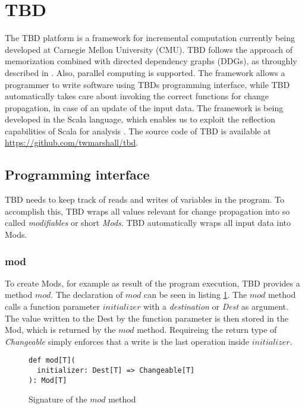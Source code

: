 \section{TBD}
\label{sec:tbd}
The TBD platform is a framework for incremental computation currently being developed at Carnegie Mellon University (CMU). TBD follows the approach of memorization combined with directed dependency graphs (DDGs), as throughly described in \cite{Acar2005thesis}. Also, parallel computing is supported. The framework allows a programmer to write software using TBDs programming interface, while TBD automatically takes care about invoking the correct functions for change propagation, in case of an update of the input data. \cite{?}
The framework is being developed in the Scala language, which enables us to exploit the reflection capabilities of Scala for analysis \cite{burmako2013scala} \cite{stocker2010scala}. 
The source code of TBD is available at \hyperref[]{https://github.com/twmarshall/tbd}. 

\subsection{Programming interface}
TBD needs to keep track of reads and writes of variables in the program. To accomplish this, TBD wraps all values relevant for change propagation into so called \textit{modifiables} or short \textit{Mods}. TBD automatically wraps all input data into Mods. 

\subsubsection{mod}
To create Mods, for example as result of the program execution, TBD provides a method $mod$. The declaration of $mod$ can be seen in listing \ref{code:mod}. The $mod$ method calls a function parameter $initializer$ with a \textit{destination} or \textit{Dest} as argument. The value written to the Dest by the function parameter is then stored in the Mod, which is returned by the $mod$ method. Requireing the return type of \textit{Changeable} simply enforces that a write is the last operation inside $initializer$. 

\begin{figure}
\begin{lstlisting}[frame=single,basicstyle=\ttfamily]
def mod[T](
  initializer: Dest[T] => Changeable[T]
): Mod[T]
\end{lstlisting}
\caption{Signature of the $mod$ method}
\label{code:mod}
\end{figure}

